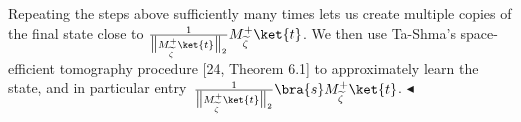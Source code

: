 Repeating the steps above sufficiently many times lets us create multiple copies of the final state close to $\frac{1}{\big{\|}M_{\widetilde{\zeta}}^{+}\ket{t}\big{\|}_{2}}M_{\widetilde{\zeta}}^{+}\ket{t}$.
We then use Ta-Shma’s space-efficient tomography procedure [24, Theorem 6.1] to approximately learn the state, and in particular entry $\frac{1}{\big{\|}M_{\widetilde{\zeta}}^{+}\ket{t}\big{\|}_{2}}\bra{s}M_{\widetilde{\zeta}}^{+}\ket{t}$.
$\blacktriangleleft$\par




\par



